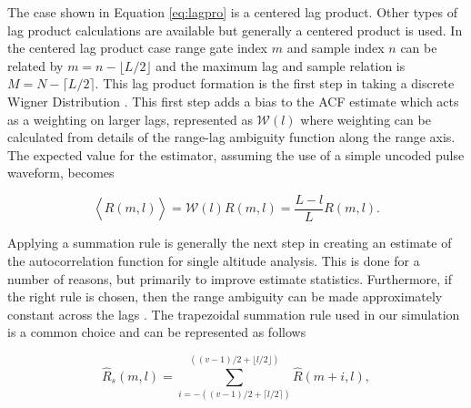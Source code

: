 The case shown in Equation \ref{eq:lagpro} is a centered lag product.  Other types of lag product calculations are available but generally a centered product is used. In the centered lag product case range gate index $m$ and sample index $n$ can be related by $m=n-\lfloor L/2\rfloor$ and the maximum lag and sample relation is $M=N-\lceil L/2 \rceil$.  This lag product formation is the first step in taking a discrete Wigner Distribution \cite{TFAcohen}. This first step adds a bias to the ACF estimate which acts as a weighting on larger lags, represented as $\mathcal{W}(l)$ where weighting can be calculated from details of the range-lag ambiguity function along the range axis. The expected value for the estimator, assuming the use of a simple uncoded pulse waveform, becomes

\begin{equation}
\label{eq:lagprobias}
\left\langle\widehat{R}(m,l) \right\rangle = \mathcal{W}(l)R(m,l) =\frac{L-l}{L}R(m,l).
\end{equation}
%
%

Applying a summation rule is generally the next step in creating an estimate of the autocorrelation function for single altitude analysis. This is done for a number of reasons, but primarily to improve estimate statistics.  Furthermore, if the right rule is chosen, then the range ambiguity can be made approximately constant across the lags \cite{nygren1996}. The trapezoidal summation rule used in our simulation is a common choice and can be represented as follows

\begin{equation}
\label{eq:sumrule}
\widehat{R}_s(m,l) = \displaystyle\sum\limits_{i=-((v-1)/2+\lceil l/2 \rceil)}^{((v-1)/2+\lfloor l/2\rfloor)} \widehat{R}(m+i,l),
\end{equation}

